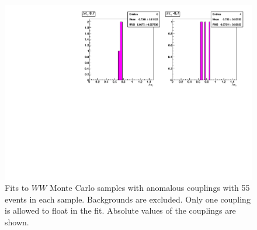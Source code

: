 \begin{figure}[tp]
  \centerline{
    \includegraphics[width=1.0\textwidth]{figures/fit_wwATGC_mc_1D_abs2}
  }

  \caption[1D fits to WW aTGC Monte Carlo] {Fits to $WW$ Monte Carlo
    samples with anomalous couplings with 55 events in each sample. Backgrounds
    are excluded. Only one coupling is allowed to float in the fit. Absolute
    values of the couplings are shown.}
  \label{fig:fit_wwATGC_mc_1D_abs2}
\end{figure}
